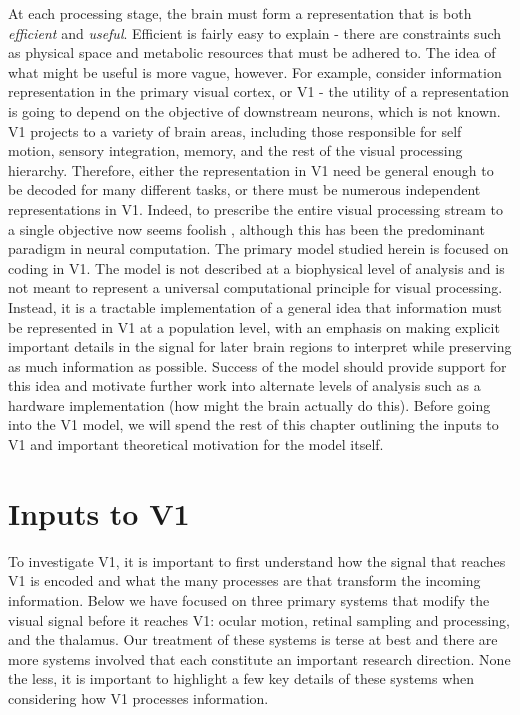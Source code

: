 At each processing stage, the brain must form a representation that is both \textit{efficient} and \textit{useful}. Efficient is fairly easy to explain - there are constraints such as physical space and metabolic resources that must be adhered to. The idea of what might be useful is more vague, however. For example, consider information representation in the primary visual cortex, or V1 - the utility of a representation is going to depend on the objective of downstream neurons, which is not known. V1 projects to a variety of brain areas, including those responsible for self motion, sensory integration, memory, and the rest of the visual processing hierarchy. Therefore, either the representation in V1 need be general enough to be decoded for many different tasks, or there must be numerous independent representations in V1. Indeed, to prescribe the entire visual processing stream to a single objective now seems foolish \parencite{barlow2001redundancy}, although this has been the predominant paradigm in neural computation. The primary model studied herein is focused on coding in V1. The model is not described at a biophysical level of analysis and is not meant to represent a universal computational principle for visual processing. Instead, it is a tractable implementation of a general idea that information must be represented in V1 at a population level, with an emphasis on making explicit important details in the signal for later brain regions to interpret while preserving as much information as possible. Success of the model should provide support for this idea and motivate further work into alternate levels of analysis such as a hardware implementation (how might the brain actually do this). Before going into the V1 model, we will spend the rest of this chapter outlining the inputs to V1 and important theoretical motivation for the model itself.


\section{Inputs to V1}
To investigate V1, it is important to first understand how the signal that reaches V1 is encoded and what the many processes are that transform the incoming information. Below we have focused on three primary systems that modify the visual signal before it reaches V1: ocular motion, retinal sampling and processing, and the thalamus. Our treatment of these systems is terse at best and there are more systems involved that each constitute an important research direction. None the less, it is important to highlight a few key details of these systems when considering how V1 processes information.


